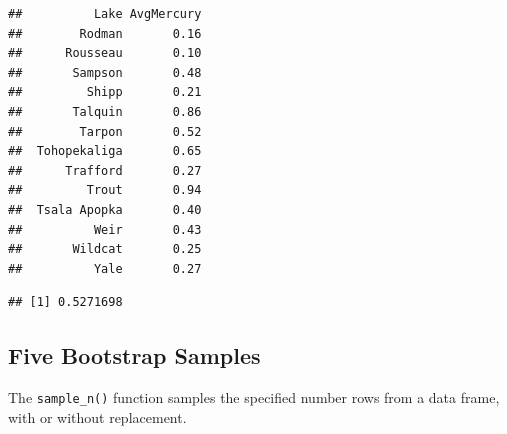 \documentclass[]{book}
\newenvironment{Shaded}{\begin{snugshade}}{\end{snugshade}}
\newcommand{\KeywordTok}[1]{\textcolor[rgb]{0.13,0.29,0.53}{\textbf{#1}}}
\newcommand{\DataTypeTok}[1]{\textcolor[rgb]{0.13,0.29,0.53}{#1}}
\newcommand{\DecValTok}[1]{\textcolor[rgb]{0.00,0.00,0.81}{#1}}
\newcommand{\StringTok}[1]{\textcolor[rgb]{0.31,0.60,0.02}{#1}}
\newcommand{\OtherTok}[1]{\textcolor[rgb]{0.56,0.35,0.01}{#1}}
\newcommand{\OperatorTok}[1]{\textcolor[rgb]{0.81,0.36,0.00}{\textbf{#1}}}
\newcommand{\NormalTok}[1]{#1}
\begin{document}
\begin{verbatim}
##          Lake AvgMercury
##        Rodman       0.16
##      Rousseau       0.10
##       Sampson       0.48
##         Shipp       0.21
##       Talquin       0.86
##        Tarpon       0.52
##  Tohopekaliga       0.65
##      Trafford       0.27
##         Trout       0.94
##  Tsala Apopka       0.40
##          Weir       0.43
##       Wildcat       0.25
##          Yale       0.27
\end{verbatim}

\begin{Shaded}
\end{Shaded}

\begin{verbatim}
## [1] 0.5271698
\end{verbatim}

\subsection{Five Bootstrap Samples}\label{five-bootstrap-samples}

The \texttt{sample\_n()} function samples the specified number rows from
a data frame, with or without replacement.

\begin{Shaded}
\end{Shaded}

\begin{Shaded}
\end{Shaded}

\begin{Shaded}
\end{Shaded}
\end{document}
